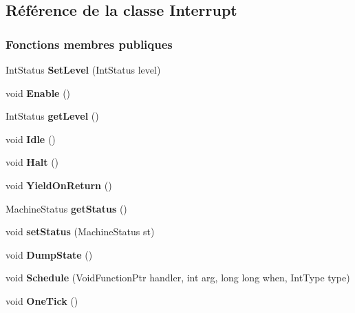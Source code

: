 \hypertarget{class_interrupt}{}\subsection{Référence de la classe Interrupt}
\label{class_interrupt}
\subsubsection*{Fonctions membres publiques}
\begin{DoxyCompactItemize}
\item 
\hypertarget{class_interrupt_af55a6cea64a8a3de49bad9ea3843addb}{}\label{class_interrupt_af55a6cea64a8a3de49bad9ea3843addb} 
Int\+Status {\bfseries Set\+Level} (Int\+Status level)
\item 
\hypertarget{class_interrupt_a16eca26a7162f7099e5b043d0c0de344}{}\label{class_interrupt_a16eca26a7162f7099e5b043d0c0de344} 
void {\bfseries Enable} ()
\item 
\hypertarget{class_interrupt_aa519deead8b512a52ba4ad9fb0e2643b}{}\label{class_interrupt_aa519deead8b512a52ba4ad9fb0e2643b} 
Int\+Status {\bfseries get\+Level} ()
\item 
\hypertarget{class_interrupt_ace54aece18806bae3614ebf9cc8c2991}{}\label{class_interrupt_ace54aece18806bae3614ebf9cc8c2991} 
void {\bfseries Idle} ()
\item 
\hypertarget{class_interrupt_a4d9820efbc3e9fd82e82f2eb6ef3613b}{}\label{class_interrupt_a4d9820efbc3e9fd82e82f2eb6ef3613b} 
void {\bfseries Halt} ()
\item 
\hypertarget{class_interrupt_a2dd7548881fde3cf3c8fba4d75437849}{}\label{class_interrupt_a2dd7548881fde3cf3c8fba4d75437849} 
void {\bfseries Yield\+On\+Return} ()
\item 
\hypertarget{class_interrupt_a6b240d463c36d4dcb18c444d4f71b778}{}\label{class_interrupt_a6b240d463c36d4dcb18c444d4f71b778} 
Machine\+Status {\bfseries get\+Status} ()
\item 
\hypertarget{class_interrupt_a35a3cf7b10315addeee6ed0730225d57}{}\label{class_interrupt_a35a3cf7b10315addeee6ed0730225d57} 
void {\bfseries set\+Status} (Machine\+Status st)
\item 
\hypertarget{class_interrupt_a8f9a7ddd0f250de0dcd45fa5bfd80c11}{}\label{class_interrupt_a8f9a7ddd0f250de0dcd45fa5bfd80c11} 
void {\bfseries Dump\+State} ()
\item 
\hypertarget{class_interrupt_a78dd8c83735e5e73c056e87f3a47d3cb}{}\label{class_interrupt_a78dd8c83735e5e73c056e87f3a47d3cb} 
void {\bfseries Schedule} (Void\+Function\+Ptr handler, int arg, long long when, Int\+Type type)
\item 
\hypertarget{class_interrupt_af7e385b28c374d35c4ca3763efac2b33}{}\label{class_interrupt_af7e385b28c374d35c4ca3763efac2b33} 
void {\bfseries One\+Tick} ()
\end{DoxyCompactItemize}
